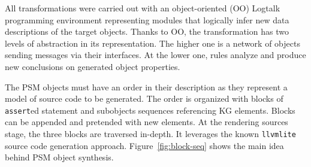 \documentclass[
]{ceurart}
\begin{document}
All transformations were carried out with an object-oriented (OO) Logtalk programming environment representing modules that logically infer new data descriptions of the target objects.  Thanks to OO, the transformation has two levels of abstraction in its representation.  The higher one is a network of objects sending messages via their interfaces.  At the lower one, rules analyze and produce new conclusions on generated object properties.

The PSM objects must have an order in their description as they represent a model of source code to be generated.  The order is organized with blocks of \verb|assert|ed statement and subobjects sequences referencing KG elements.  Blocks can be appended and pretended with new elements.  At the rendering sources stage, the three blocks are traversed in-depth.  It leverages the known \verb|llvmlite| source code generation approach.  Figure~\ref{fig:block-seq} shows the main idea behind PSM object synthesis.
\end{document}
